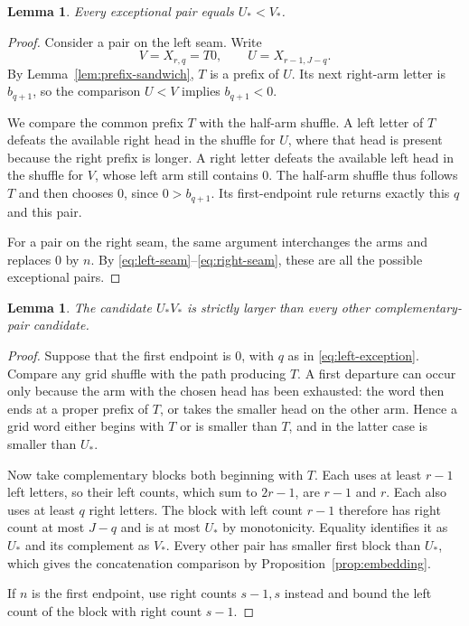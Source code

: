 \documentclass[11pt]{amsart}
\numberwithin{equation}{section}
\newtheorem{lemma}[theorem]{Lemma}
\theoremstyle{definition}
\begin{document}
\begin{lemma}\label{lem:exception-unique}
Every exceptional pair equals $U_*<V_*$.
\end{lemma}
\begin{proof}
Consider a pair on the left seam. Write
\[
 V=X_{r,q}=T0,\qquad U=X_{r-1,J-q}.
\]
By Lemma~\ref{lem:prefix-sandwich}, $T$ is a prefix of $U$. Its next right-arm letter is $b_{q+1}$, so the comparison $U<V$ implies $b_{q+1}<0$.

We compare the common prefix $T$ with the half-arm shuffle. A left letter of $T$ defeats the available right head in the shuffle for $U$, where that head is present because the right prefix is longer. A right letter defeats the available left head in the shuffle for $V$, whose left arm still contains $0$. The half-arm shuffle thus follows $T$ and then chooses $0$, since $0>b_{q+1}$. Its first-endpoint rule returns exactly this $q$ and this pair.

For a pair on the right seam, the same argument interchanges the arms and replaces $0$ by $n$. By \eqref{eq:left-seam}--\eqref{eq:right-seam}, these are all the possible exceptional pairs.
\end{proof}

\begin{lemma}\label{lem:exception-maximal}
The candidate $U_*V_*$ is strictly larger than every other complementary-pair candidate.
\end{lemma}
\begin{proof}
Suppose that the first endpoint is $0$, with $q$ as in \eqref{eq:left-exception}. Compare any grid shuffle with the path producing $T$. A first departure can occur only because the arm with the chosen head has been exhausted: the word then ends at a proper prefix of $T$, or takes the smaller head on the other arm. Hence a grid word either begins with $T$ or is smaller than $T$, and in the latter case is smaller than $U_*$.

Now take complementary blocks both beginning with $T$. Each uses at least $r-1$ left letters, so their left counts, which sum to $2r-1$, are $r-1$ and $r$. Each also uses at least $q$ right letters. The block with left count $r-1$ therefore has right count at most $J-q$ and is at most $U_*$ by monotonicity. Equality identifies it as $U_*$ and its complement as $V_*$. Every other pair has smaller first block than $U_*$, which gives the concatenation comparison by Proposition~\ref{prop:embedding}.

If $n$ is the first endpoint, use right counts $s-1,s$ instead and bound the left count of the block with right count $s-1$.
\end{proof}
\end{document}
